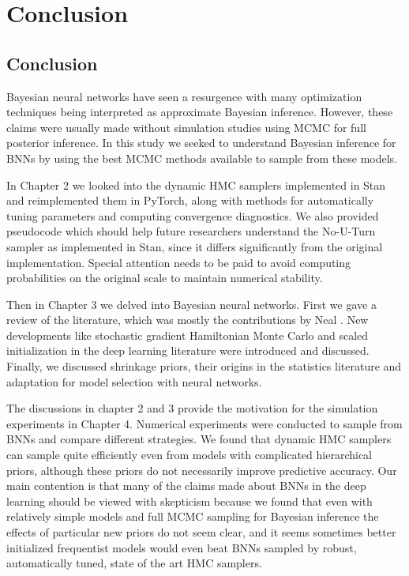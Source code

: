 \documentclass[12pt]{report}
\begin{document}
\chapter{Conclusion}
\section{Conclusion}

	Bayesian neural networks have seen a resurgence with many optimization techniques being interpreted as approximate Bayesian inference. However, these claims were usually made without simulation studies using MCMC for full posterior inference. In this study we seeked to understand Bayesian inference for BNNs by using the best MCMC methods available to sample from these models. 


In Chapter 2 we looked into the dynamic HMC samplers implemented in Stan and reimplemented them in PyTorch, along with methods for automatically tuning parameters and computing convergence diagnostics. We also provided pseudocode which should help future researchers understand the No-U-Turn sampler as implemented in Stan, since it differs significantly from the original implementation. Special attention needs to be paid to avoid computing probabilities on the original scale to maintain numerical stability.

Then in Chapter 3 we delved into Bayesian neural networks. First we gave a review of the literature, which was mostly the contributions by Neal \cite{neal1993bayesian}. New developments like stochastic gradient Hamiltonian Monte Carlo and scaled initialization in the deep learning literature \cite{chen2014stochastic,bengio1994learning} were introduced and discussed. Finally, we discussed shrinkage priors, their origins in the statistics literature and adaptation for model selection with neural networks. 

The discussions in chapter 2 and 3 provide the motivation for the simulation experiments in Chapter 4. Numerical experiments were conducted to sample from BNNs and compare different strategies. We found that dynamic HMC samplers can sample quite efficiently even from models with complicated hierarchical priors, although these priors do not necessarily improve predictive accuracy. Our main contention is that many of the claims made about BNNs in the deep learning should be viewed with skepticism because we found that even with relatively simple models and full MCMC sampling for Bayesian inference the effects of particular new priors do not seem clear, and it seems sometimes better initialized frequentist models would even beat BNNs sampled by robust, automatically tuned, state of the art HMC samplers.




\end{document}
